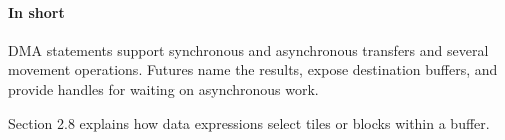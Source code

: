 \paragraph*{In short}

DMA statements support synchronous and asynchronous transfers and several movement operations. Futures name the results, expose destination buffers, and provide handles for waiting on asynchronous work.

Section 2.8 explains how data expressions select tiles or blocks within a buffer.
